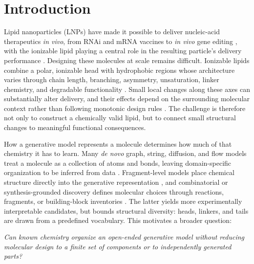\documentclass{article}
\begin{document}
\section{Introduction}
Lipid nanoparticles (LNPs) have made it possible to deliver nucleic-acid therapeutics \emph{in vivo},
from RNAi and mRNA vaccines to \emph{in vivo} gene editing
\citep{adams2018patisiran,polack2020safety,baden2021efficacy,gillmore2021crispr}, with the ionizable
lipid playing a central role in the resulting particle's delivery performance
\citep{cullis2017lipid,hou2021lipid}. Designing these molecules at scale remains difficult. Ionizable
lipids combine a polar, ionizable head with hydrophobic regions whose architecture varies through
chain length, branching, asymmetry, unsaturation, linker chemistry, and degradable functionality
\citep{semple2010rational,jayaraman2012maximizing,whitehead2014degradable,hajj2019branched,sabnis2018novel,lee2021systematic}.
Small local changes along these axes can substantially alter delivery, and their effects depend on
the surrounding molecular context rather than following monotonic design rules
\citep{cheng2020selective,han2021ionizable,hatit2023nanoparticle}. The challenge is therefore not
only to construct a chemically valid lipid, but to connect small structural changes to meaningful
functional consequences.

How a generative model represents a molecule determines how much of that chemistry it has to learn.
Many \emph{de novo} graph, string, diffusion, and flow models treat a molecule as a collection of
atoms and bonds, leaving domain-specific organization to be inferred from data
\citep{austin2021structured,vignac2023digress,lipman2023flow}. Fragment-level models place chemical
structure directly into the generative representation \citep{fragfm}, and combinatorial or
synthesis-grounded discovery defines molecular choices through reactions, fragments, or
building-block inventories
\citep{bradshaw2020barking,gao2022amortized,cretu2025synflownet,koziarski2024rgfn,luo2024projecting}.
The latter yields more experimentally interpretable candidates, but bounds structural diversity:
heads, linkers, and tails are drawn from a predefined vocabulary. This motivates a broader question:

\begin{center}
\begin{minipage}{0.92\linewidth}
\centering
\emph{Can known chemistry organize an open-ended generative model without reducing molecular
design to a finite set of components or to independently generated parts?}
\end{minipage}
\end{center}
\end{document}
